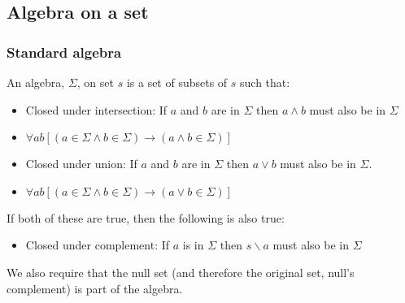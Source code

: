 
\subsection{Algebra on a set}

\subsubsection{Standard algebra}

An algebra, \(\Sigma \), on set \(s\) is a set of subsets of \(s\) such that:

\begin{itemize}
\item Closed under intersection: If \(a\) and \(b\) are in \(\Sigma \) then \(a\land b\) must also be in \(\Sigma \)
\item \(\forall ab [(a \in \Sigma \land b \in \Sigma )\rightarrow (a\land b \in \Sigma)]\)
\item Closed under union: If \(a\) and \(b\) are in \(\Sigma \) then \(a\lor b\) must also be in \(\Sigma \).
\item \(\forall ab [(a \in \Sigma \land b \in \Sigma )\rightarrow (a\lor b \in \Sigma)]\)
\end{itemize}

If both of these are true, then the following is also true:

\begin{itemize}
\item Closed under complement: If \(a\) is in \(\Sigma \) then \(s \backslash a\) must also be in \(\Sigma \)
\end{itemize}

We also require that the null set (and therefore the original set, null's complement) is part of the algebra.

